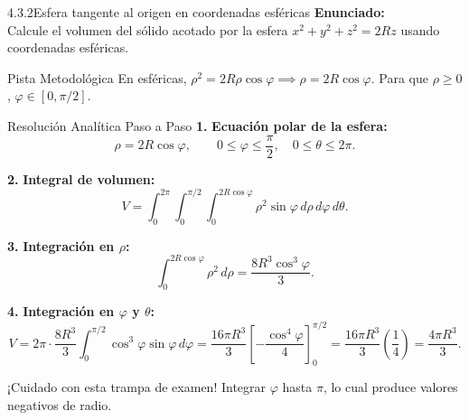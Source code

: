 \documentclass[11pt,a4paper]{article}
\begin{document}
\begin{nivelbox}{4.3.2}{Esfera tangente al origen en coordenadas esféricas}
\textbf{Enunciado:}\\
Calcule el volumen del sólido acotado por la esfera $x^2 + y^2 + z^2 = 2R z$ usando coordenadas esféricas.

\begin{observacionbox}{Pista Metodológica}
En esféricas, $\rho^2 = 2R \rho\cos\varphi \implies \rho = 2R\cos\varphi$. Para que $\rho \ge 0$, $\varphi \in [0, \pi/2]$.
\end{observacionbox}

\begin{ejerciciobox}{Resolución Analítica Paso a Paso}
\smallskip\noindent\textbf{1.} \textbf{Ecuación polar de la esfera:}
\[\rho = 2R\cos\varphi, \qquad 0 \le \varphi \le \frac{\pi}{2}, \quad 0 \le \theta \le 2\pi.\]

\smallskip\noindent\textbf{2.} \textbf{Integral de volumen:}
\[V = \int_0^{2\pi} \int_0^{\pi/2} \int_0^{2R\cos\varphi} \rho^2 \sin\varphi \, d\rho \, d\varphi \, d\theta.\]

\smallskip\noindent\textbf{3.} \textbf{Integración en $\rho$:}
\[\int_0^{2R\cos\varphi} \rho^2 \, d\rho = \frac{8R^3 \cos^3\varphi}{3}.\]

\smallskip\noindent\textbf{4.} \textbf{Integración en $\varphi$ y $\theta$:}
\[V = 2\pi \cdot \frac{8R^3}{3} \int_0^{\pi/2} \cos^3\varphi \sin\varphi \, d\varphi = \frac{16\pi R^3}{3} \left[ -\frac{\cos^4\varphi}{4} \right]_0^{\pi/2} = \frac{16\pi R^3}{3} \left( \frac{1}{4} \right) = \frac{4\pi R^3}{3}.\]
\end{ejerciciobox}

\begin{errorbox}{¡Cuidado con esta trampa de examen!}
Integrar $\varphi$ hasta $\pi$, lo cual produce valores negativos de radio.
\end{errorbox}
\end{nivelbox}
\bigskip
\end{document}
